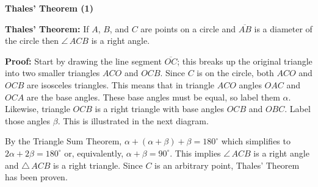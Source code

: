 \documentclass[12pt]{article}
\begin{document}
\begin{center}
\Large{\textbf{Thales' Theorem (1)}}
\end{center}
\textbf{Thales' Theorem:} If $A$, $B$, and $C$ are points on a circle and
$\overline{AB}$ is a diameter of the circle then $\angle \,ACB$ is a right angle.\\

\begin{center}
\end{center}

\noindent \textbf{Proof:} Start by drawing the line segment $\overline{OC}$; this
breaks up the original triangle into two smaller triangles $ACO$ and $OCB$. Since $C$ is on 
the circle, both $ACO$ and $OCB$ are isosceles triangles. This means that in triangle $ACO$ 
angles $OAC$ and $OCA$ are the base angles. These base angles must be equal, so label them
$\alpha$. Likewise, triangle $OCB$ is a right triangle with base angles $OCB$ and $OBC$. Label
those angles $\beta$. This is illustrated in the next diagram. 
\begin{center}
\end{center}

By the Triangle Sum Theorem, $\alpha + (\alpha + \beta) + \beta = 180^{\circ}$ which 
simplifies to $2\alpha + 2\beta = 180^{\circ}$ or, equivalently, $\alpha + \beta = 90^{\circ}$.
This implies $\angle \,ACB$ is a right angle and $\triangle \,ACB$ is a right triangle. Since
$C$ is an arbitrary point, Thales' Theorem has been proven.
\end{document}
